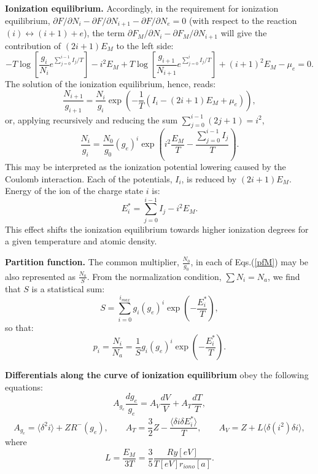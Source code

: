 {\bf Ionization equilibrium.} Accordingly, in the requirement for ionization equilibrium, $\partial F/\partial N_i - \partial F/\partial N_{i+1} - \partial F/\partial N_e = 0$ (with respect to the reaction $(i)\leftrightarrow(i+1)+e$),
the term $\partial F_{M}/\partial N_i -\partial F_{M}/\partial N_{i+1}$ will 
give the contribution of $(2i+1) E_M$ to the left side:
\begin{equation}
-T \log \left[ \frac{g_i}    {N_i}     e^{\sum_{j=0}^{i-1} I_j/T} \right] - i^2 E_M
+T \log \left[ \frac{g_{i+1}}{N_{i+1}} e^{\sum_{j=0}^i     I_j/T} \right] + (i+1)^2 E_M
-\mu_e = 0.
\end{equation}
The solution of the ionization equilibrium, hence, reads:
\begin{equation}
\frac{N_{i+1}}{g_{i+1}} = \frac{N_i}{g_i} \exp\left(-\frac1T \left(I_i - (2i+1) E_M + \mu_e \right)\right),
\end{equation}
or, applying recursively and reducing the sum $\sum_{j=0}^{i-1} (2j+1) = i^2$,
\begin{equation}\label{pfM}
\frac{N_i}{g_i}=\frac{N_0}{g_0}(g_e)^i \exp \left( i^2 \frac{E_M}{T} -\frac{\sum_{j=0}^{i-1}I_j}T \right) .
\end{equation}
This may be interpreted as the ionization potential lowering caused by the Coulomb interaction.
Each of the potentials, $I_i$, is reduced by $(2i+1)E_M$.
Energy of the ion of the charge state $i$ is:
\begin{equation}\label{estar}
E_i^* = \sum_{j=0}^{i-1}I_j - i^2 E_M.
\end{equation}
This effect shifts the ionization equilibrium towards higher ionization degrees for a given temperature and atomic density.

{\bf Partition function.} The common multiplier, $\frac{N_0}{g_0}$, in each of Eqs.(\ref{pfM}) may be also represented as $\frac{N_a}{S}$.
From the normalization condition, $\sum N_i = N_a$, we find that $S$ is a statistical sum:
\begin{equation}\label{MadS}
S=\sum_{i=0}^{i_{max}} g_i (g_e)^i \exp\left(-\frac{E_i^*}T\right),
\end{equation}
so that:
\begin{equation}\label{ni}
p_i = \frac{N_i}{N_a} = \frac{1}S g_i (g_e)^i \exp \left( -\frac{E_i^*}T \right).
\end{equation}

{\bf Differentials along the curve of ionization equilibrium} obey the following equations:
\begin{equation}\label{diffstruct}
A_{g_e} \frac{dg_e}{g_e} = A_V \frac{dV}{V} + A_T \frac{dT}{T},
\end{equation}
\begin{equation}
A_{g_e} = \langle \delta^2 i \rangle + ZR^-(g_e), \qquad
A_T     = \frac32 Z - \frac{\langle \delta i \delta E^*_i \rangle}{T}, \qquad
A_V     = Z + L \langle \delta(i^2) \delta i \rangle,
\end{equation}
where 
\begin{equation}
L   = \frac{E_M}{3T} = \frac35 \frac{Ry[eV]}{T[eV] r_{iono}[a]}.
\end{equation}

